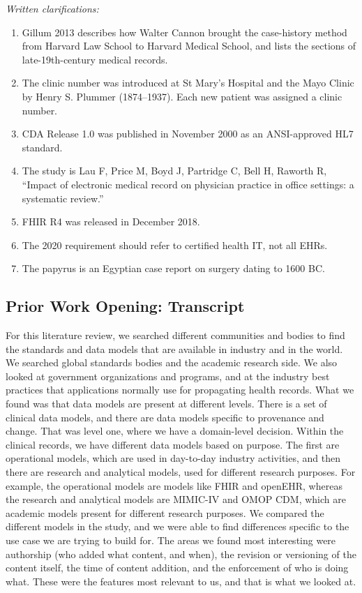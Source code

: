 \documentclass[sigconf]{acmart}
\begin{document}
\medskip
\noindent\textit{Written clarifications:}
\begin{enumerate}
\item Gillum 2013 describes how Walter Cannon brought the case-history method
from Harvard Law School to Harvard Medical School, and lists the sections of
late-19th-century medical records. 
\item The clinic number was introduced at St Mary's Hospital and the Mayo
Clinic by Henry S. Plummer (1874--1937). Each new patient was assigned a clinic
number.
\item CDA Release 1.0 was published in November 2000 as an ANSI-approved HL7
standard.
\item The study is Lau F, Price M, Boyd J, Partridge C, Bell H, Raworth R,
``Impact of electronic medical record on physician practice in office
settings: a systematic review.''
\item FHIR R4 was released in December 2018.
\item The 2020 requirement should refer to certified health IT, not all EHRs.
\item The papyrus is an Egyptian case report on surgery dating to 1600 BC.
\end{enumerate}

\subsection{Prior Work Opening: Transcript}
For this literature review, we searched different communities and bodies to
find the standards and data models that are available in industry and in the
world. We searched global standards bodies and the academic research side. We
also looked at government organizations and programs, and at the industry best
practices that applications normally use for propagating health records. What
we found was that data models are present at different levels. There is a set
of clinical data models, and there are data models specific to provenance and
change. That was level one, where we have a domain-level decision. Within the
clinical records, we have different data models based on purpose. The first
are operational models, which are used in day-to-day industry activities, and
then there are research and analytical models, used for different research
purposes. For example, the operational models are models like FHIR and
openEHR, whereas the research and analytical models are MIMIC-IV and OMOP CDM,
which are academic models present for different research purposes. We
compared the different models in the study, and we were able to find
differences specific to the use case we are trying to build for. The areas we
found most interesting were authorship (who added what content, and when), the
revision or versioning of the content itself, the time of content addition,
and the enforcement of who is doing what. These were the features most
relevant to us, and that is what we looked at.
\end{document}
